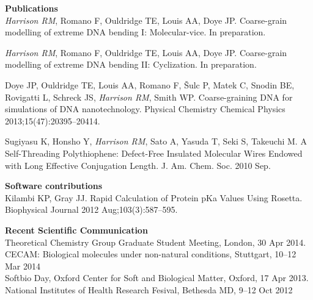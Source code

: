 \documentclass[margin]{res}
\begin{document}
\begin{sloppypar}
\begin{resume}
\textbf{Publications} \\
\textit{Harrison RM}, Romano F, Ouldridge TE, Louis AA, Doye JP. Coarse-grain modelling of extreme DNA bending I: Molecular-vice. In preparation.

\textit{Harrison RM}, Romano F, Ouldridge TE, Louis AA, Doye JP. Coarse-grain modelling of extreme DNA bending II: Cyclization. In preparation.

Doye JP, Ouldridge TE, Louis AA, Romano F, \v{S}ulc P, Matek C, Snodin BE, Rovigatti L, Schreck JS, \textit{Harrison RM}, Smith WP. Coarse-graining DNA for simulations of DNA nanotechnology. Physical Chemistry Chemical Physics 2013;15(47):20395--20414.

Sugiyasu K, Honsho Y, \textit{Harrison RM}, Sato A, Yasuda T, Seki S, Takeuchi M. A Self-Threading Polythiophene: Defect-Free Insulated Molecular Wires Endowed with Long Effective Conjugation Length. J. Am. Chem. Soc. 2010 Sep.


\textbf{Software contributions} \\
Kilambi KP, Gray JJ. Rapid Calculation of Protein pKa Values Using Rosetta. Biophysical Journal 2012 Aug;103(3):587--595.

\textbf{Recent Scientific Communication} \\
Theoretical Chemistry Group Graduate Student Meeting, London, 30 Apr 2014. \\
CECAM: Biological molecules under non-natural conditions, Stuttgart, 10--12 Mar 2014 \\
Softbio Day, Oxford Center for Soft and Biological Matter, Oxford, 17 Apr 2013.
National Institutes of Health Research Fesival, Bethesda MD, 9--12 Oct 2012 




\end{resume}
\end{sloppypar}
\end{document}
